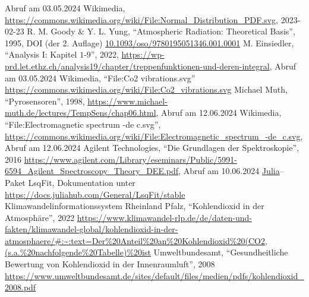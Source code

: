 \documentclass[12pt,a4paper]{scrartcl}
\numberwithin{equation}{section} %
\newcommand{\code}[1]{\textsf{#1}}
\begin{document}
\begin{thebibliography}{9}
		Abruf am 03.05.2024
		Wikimedia,
		\url{https://commons.wikimedia.org/wiki/File:Normal_Distribution_PDF.svg},
		2023-02-23
		R. M. Goody \& Y. L. Yung, ``Atmospheric Radiation: Theoretical Basis'', 1995,
		DOI  (der 2. Auflage) \href{https://doi.org/10.1093/oso/9780195051346.001.0001}{10.1093/oso/9780195051346.001.0001}
		M. Einsiedler, ``Analysis I: Kapitel $1$-$9$'', 2022,
		\url{https://wp-prd.let.ethz.ch/analysis19/chapter/treppenfunktionen-und-deren-integral},
		Abruf am 03.05.2024
		Wikimedia, ``File:Co2 vibrations.svg''
		\url{https://commons.wikimedia.org/wiki/File:Co2_vibrations.svg}
		Michael Muth, ``Pyrosensoren'', 1998,
		\url{https://www.michael-muth.de/lectures/TempSens/chap06.html}, Abruf am 12.06.2024
		Wikimedia, ``File:Electromagnetic spectrum -de c.svg'',
		\url{https://commons.wikimedia.org/wiki/File:Electromagnetic_spectrum_-de_c.svg}, Abruf am 12.06.2024
		Agilent Technologies, ``Die Grundlagen der Spektroskopie'', 2016
		\url{https://www.agilent.com/Library/eseminars/Public/5991-6594_Agilent_Spectroscopy_Theory_DEE.pdf},
		Abruf am 10.06.2024
		\code{\href{https://julialang.org}{Julia}}--Paket \code{LsqFit},
		Dokumentation unter \url{https://docs.juliahub.com/General/LsqFit/stable}
		Klimawandelinformationssystem Rheinland Pfalz, ``Kohlendioxid in der Atmosphäre'', 2022
		\url{https://www.klimawandel-rlp.de/de/daten-und-fakten/klimawandel-global/kohlendioxid-in-der-atmosphaere/#:~:text=Der%20Anteil%20an%20Kohlendioxid%20(CO2,(s.a.%20nachfolgende%20Tabelle)%20ist}
		Umweltbundesamt, ``Gesundheitliche Bewertung
		von Kohlendioxid in der
		Innenraumluft'', 2008
		\url{https://www.umweltbundesamt.de/sites/default/files/medien/pdfs/kohlendioxid_2008.pdf}
	\end{thebibliography}
\end{document}
